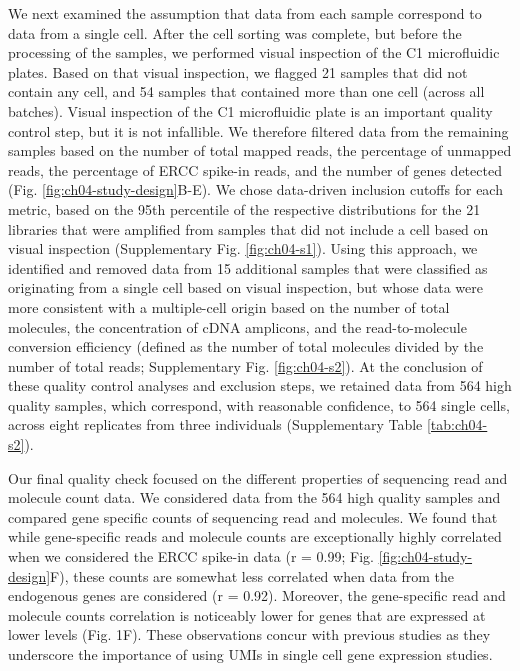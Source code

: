 We next examined the assumption that data from each sample correspond
to data from a single cell. After the cell sorting was complete, but
before the processing of the samples, we performed visual inspection
of the C1 microfluidic plates. Based on that visual inspection, we
flagged 21 samples that did not contain any cell, and 54 samples that
contained more than one cell (across all batches). Visual inspection
of the C1 microfluidic plate is an important quality control step, but
it is not infallible. We therefore filtered data from the remaining
samples based on the number of total mapped reads, the percentage of
unmapped reads, the percentage of ERCC spike-in reads, and the number
of genes detected (Fig. \ref{fig:ch04-study-design}B-E). We chose
data-driven inclusion cutoffs for each metric, based on the 95th
percentile of the respective distributions for the 21 libraries that
were amplified from samples that did not include a cell based on
visual inspection (Supplementary Fig. \ref{fig:ch04-s1}). Using this
approach, we identified and removed data from 15 additional samples
that were classified as originating from a single cell based on visual
inspection, but whose data were more consistent with a multiple-cell
origin based on the number of total molecules, the concentration of
cDNA amplicons, and the read-to-molecule conversion efficiency
(defined as the number of total molecules divided by the number of
total reads; Supplementary Fig.  \ref{fig:ch04-s2}). At the conclusion
of these quality control analyses and exclusion steps, we retained
data from 564 high quality samples, which correspond, with reasonable
confidence, to 564 single cells, across eight replicates from three
individuals (Supplementary Table \ref{tab:ch04-s2}).

Our final quality check focused on the different properties of
sequencing read and molecule count data. We considered data from the
564 high quality samples and compared gene specific counts of
sequencing read and molecules. We found that while gene-specific reads
and molecule counts are exceptionally highly correlated when we
considered the ERCC spike-in data (r = 0.99;
Fig. \ref{fig:ch04-study-design}F), these counts are somewhat less
correlated when data from the endogenous genes are considered (r =
0.92). Moreover, the gene-specific read and molecule counts
correlation is noticeably lower for genes that are expressed at lower
levels (Fig.  1F). These observations concur with previous studies
\citep{Islam2014, Grun2014} as they underscore the importance of using
UMIs in single cell gene expression studies.

